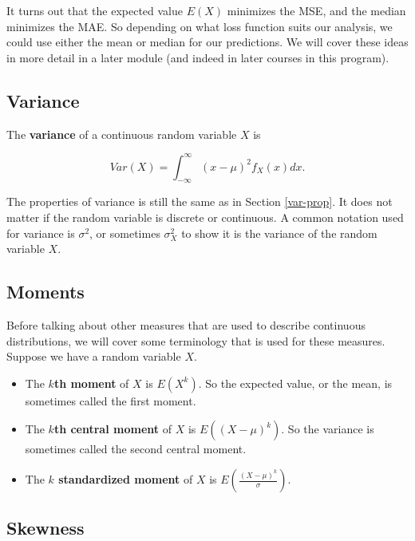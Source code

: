 \documentclass[
]{book}
\providecommand{\tightlist}{%
  \setlength{\itemsep}{0pt}\setlength{\parskip}{0pt}}
\begin{document}
It turns out that the expected value \(E(X)\) minimizes the MSE, and the median minimizes the MAE. So depending on what loss function suits our analysis, we could use either the mean or median for our predictions. We will cover these ideas in more detail in a later module (and indeed in later courses in this program).

\subsection{Variance}\label{variance-1}

The \textbf{variance} of a continuous random variable \(X\) is

\begin{equation} 
Var(X) = \int_{-\infty}^{\infty} (x-\mu)^2 f_X(x) dx.
\label{eq:4-var}
\end{equation}

The properties of variance is still the same as in Section \ref{var-prop}. It does not matter if the random variable is discrete or continuous. A common notation used for variance is \(\sigma^2\), or sometimes \(\sigma_X^2\) to show it is the variance of the random variable \(X\).

\subsection{Moments}\label{moments}

Before talking about other measures that are used to describe continuous distributions, we will cover some terminology that is used for these measures. Suppose we have a random variable \(X\).

\begin{itemize}
\tightlist
\item
  The \textbf{\(k\)th moment} of \(X\) is \(E(X^k)\). So the expected value, or the mean, is sometimes called the first moment.
\item
  The \textbf{\(k\)th central moment} of \(X\) is \(E((X-\mu)^k)\). So the variance is sometimes called the second central moment.
\item
  The \textbf{\(k\) standardized moment} of \(X\) is \(E(\frac{(X-\mu)^k}{\sigma})\).
\end{itemize}

\subsection{Skewness}\label{skewness}
\end{document}

